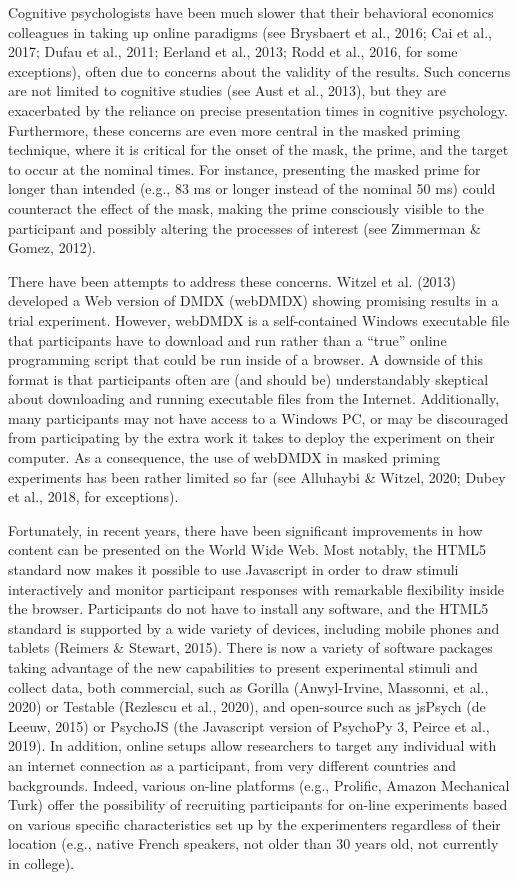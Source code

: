 \documentclass[
  english,
  man,floatsintext]{apa6}
\begin{document}
Cognitive psychologists have been much slower that their behavioral economics colleagues in taking up online paradigms (see Brysbaert et al., 2016; Cai et al., 2017; Dufau et al., 2011; Eerland et al., 2013; Rodd et al., 2016, for some exceptions), often due to concerns about the validity of the results. Such concerns are not limited to cognitive studies (see Aust et al., 2013), but they are exacerbated by the reliance on precise presentation times in cognitive psychology. Furthermore, these concerns are even more central in the masked priming technique, where it is critical for the onset of the mask, the prime, and the target to occur at the nominal times. For instance, presenting the masked prime for longer than intended (e.g., 83 ms or longer instead of the nominal 50 ms) could counteract the effect of the mask, making the prime consciously visible to the participant and possibly altering the processes of interest (see Zimmerman \& Gomez, 2012).

There have been attempts to address these concerns. Witzel et al. (2013) developed a Web version of DMDX (webDMDX) showing promising results in a trial experiment. However, webDMDX is a self-contained Windows executable file that participants have to download and run rather than a ``true'' online programming script that could be run inside of a browser. A downside of this format is that participants often are (and should be) understandably skeptical about downloading and running executable files from the Internet. Additionally, many participants may not have access to a Windows PC, or may be discouraged from participating by the extra work it takes to deploy the experiment on their computer. As a consequence, the use of webDMDX in masked priming experiments has been rather limited so far (see Alluhaybi \& Witzel, 2020; Dubey et al., 2018, for exceptions).

Fortunately, in recent years, there have been significant improvements in how content can be presented on the World Wide Web. Most notably, the HTML5 standard now makes it possible to use Javascript in order to draw stimuli interactively and monitor participant responses with remarkable flexibility inside the browser. Participants do not have to install any software, and the HTML5 standard is supported by a wide variety of devices, including mobile phones and tablets (Reimers \& Stewart, 2015). There is now a variety of software packages taking advantage of the new capabilities to present experimental stimuli and collect data, both commercial, such as Gorilla (Anwyl-Irvine, Massonni, et al., 2020) or Testable (Rezlescu et al., 2020), and open-source such as jsPsych (de Leeuw, 2015) or PsychoJS (the Javascript version of PsychoPy 3, Peirce et al., 2019). In addition, online setups allow researchers to target any individual with an internet connection as a participant, from very different countries and backgrounds. Indeed, various on-line platforms (e.g., Prolific, Amazon Mechanical Turk) offer the possibility of recruiting participants for on-line experiments based on various specific characteristics set up by the experimenters regardless of their location (e.g., native French speakers, not older than 30 years old, not currently in college).
\end{document}
